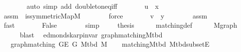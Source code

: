 \begin{isabellebody}
\ \ \ \ \ \ \isamarkupfalse%
\ {\isacharparenleft}{\kern0pt}auto\ simp\ add{\isacharcolon}{\kern0pt}\ doubleton{\isacharunderscore}{\kern0pt}eq{\isacharunderscore}{\kern0pt}iff{\isacharparenright}{\kern0pt}\isanewline
\ \ \ \ \isamarkupfalse%
\ \isamarkupfalse%
\ {\isachardoublequoteopen}u\ {\isacharequal}{\kern0pt}\ x{\isachardoublequoteclose}\isanewline
\ \ \ \ \ \ \isamarkupfalse%
\ assm{\isacharparenleft}{\kern0pt}{}{\isacharcomma}{\kern0pt}\ {}{\isacharparenright}{\kern0pt}\ is{\isacharunderscore}{\kern0pt}symmetric{\isacharunderscore}{\kern0pt}Map{\isacharunderscore}{\kern0pt}M\isanewline
\ \ \ \ \ \ \isamarkupfalse%
\ force\isanewline
\ \ \ \ \isamarkupfalse%
\ \isamarkupfalse%
\ {\isachardoublequoteopen}v\ {\isasymnoteq}\ y{\isachardoublequoteclose}\isanewline
\ \ \ \ \ \ \isamarkupfalse%
\ assm{\isacharparenleft}{\kern0pt}{}{\isacharparenright}{\kern0pt}\isanewline
\ \ \ \ \ \ \isamarkupfalse%
\ fast\isanewline
\ \ \ \ \isamarkupfalse%
\ \isamarkupfalse%
\ False\isanewline
\ \ \ \ \ \ \isamarkupfalse%
\ simp\ \isacommand{{\isacharbraceright}{\kern0pt}}\isamarkupfalse%
\isanewline
\ \ \isamarkupfalse%
\ {\isacharquery}{\kern0pt}thesis\isanewline
\ \ \ \ \isamarkupfalse%
\ matching{\isacharunderscore}{\kern0pt}def\isanewline
\ \ \ \ \isamarkupfalse%
\ M{\isachardot}{\kern0pt}graph\isanewline
\ \ \ \ \isamarkupfalse%
\ blast\isanewline
{}\isamarkupfalse%
%
\endisatagproof
{\isafoldproof}%
%
\isadelimproof
\isanewline
%
\endisadelimproof
\isanewline
{}\isamarkupfalse%
\ {\isacharparenleft}{\kern0pt}\ edmonds{\isacharunderscore}{\kern0pt}karp{\isacharunderscore}{\kern0pt}invar{\isacharparenright}{\kern0pt}\ graph{\isacharunderscore}{\kern0pt}matching{\isacharunderscore}{\kern0pt}M{\isacharunderscore}{\kern0pt}tbd{\isacharcolon}{\kern0pt}\isanewline
\ \ \ {\isachardoublequoteopen}graph{\isacharunderscore}{\kern0pt}matching\ {\isacharparenleft}{\kern0pt}G{\isachardot}{\kern0pt}E\ G{\isacharparenright}{\kern0pt}\ {\isacharparenleft}{\kern0pt}M{\isacharunderscore}{\kern0pt}tbd\ M{\isacharparenright}{\kern0pt}{\isachardoublequoteclose}\isanewline
%
\isadelimproof
\ \ %
\endisadelimproof
%
\isatagproof
{}\isamarkupfalse%
\ matching{\isacharunderscore}{\kern0pt}M{\isacharunderscore}{\kern0pt}tbd\ M{\isacharunderscore}{\kern0pt}tbd{\isacharunderscore}{\kern0pt}subset{\isacharunderscore}{\kern0pt}E\isanewline

\end{isabellebody}
